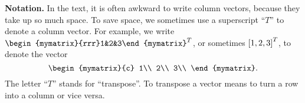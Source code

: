 \noindent\textbf{Notation.}
In the text, it is often awkward to write column vectors, because they
take up so much space. To save space, we sometimes use a superscript
``$T$'' to denote a column vector. For example, we write
$\begin{mymatrix}{rrr}1&2&3\end{mymatrix}^T$, or sometimes
$\left[1, 2, 3\right]^T$, to denote the vector
\begin{equation*}
  \begin{mymatrix}{c}
    1\\
    2\\
    3\\
  \end{mymatrix}.
\end{equation*}
The letter ``$T$'' stands for ``transpose''. To transpose a vector
means to turn a row into a column or vice versa.


